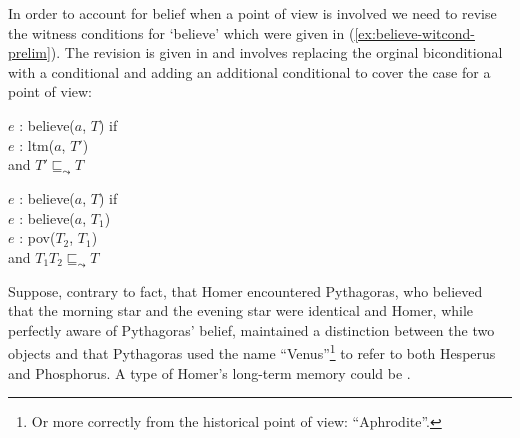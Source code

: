 
In order to account for belief when a point of view is involved we
need to revise the witness conditions for `believe' which were given
in (\ref{ex:believe-witcond-prelim}).  The revision is given in
\nexteg{} and involves replacing the orginal biconditional with a
conditional and adding an additional conditional to cover the case for
a point of view:
\begin{ex} 
$e$ : believe($a$, $T$) if\\
\hspace*{2em} $e$ : ltm($a$, $T'$) \\
\hspace*{2em} and $T'\sqsubseteq_{\leadsto}T$ 

$e$ : believe($a$, $T$) if\\
\hspace*{2em} $e$ : believe($a$, $T_1$) \\
\hspace*{2em} $e$ : pov($T_2$, $T_1$) \\
\hspace*{2em} and $T_1$\fbox{\d{$\wedge$}}$T_2 \sqsubseteq_{\leadsto}T$
\end{ex} 
  

Suppose, contrary to fact, that Homer encountered Pythagoras, who
believed that the morning star and the evening star were identical and
Homer, while perfectly aware of Pythagoras' belief, maintained a
distinction between the two objects and that Pythagoras used the name
``Venus''\footnote{Or more correctly from the historical point of
  view: ``Aphrodite''.} to refer to both Hesperus and Phosphorus.  A
type of Homer's long-term memory could be \nexteg{}.



